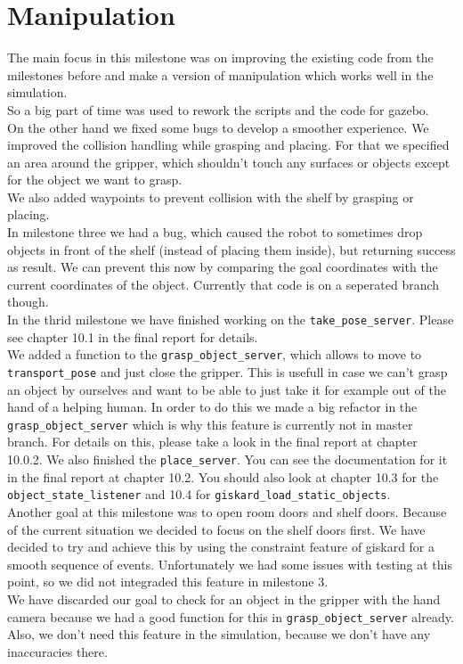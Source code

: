 \documentclass[main.tex]{subfiles}
\begin{document}
	
	\chapter{Manipulation}
	
	The main focus in this milestone was on improving the existing code from the milestones before and make a version of manipulation which works well in the simulation.\\
	So a big part of time was used to rework the scripts and the code for gazebo.\\
	On the other hand we fixed some bugs to develop a smoother experience. We improved the collision handling while grasping and placing. For that we specified an area around the gripper, which shouldn't touch any surfaces or objects except for the object we want to grasp.\\
	We also added waypoints to prevent collision with the shelf by grasping or placing.\\
	In milestone three we had a bug, which caused the robot to sometimes drop objects in front of the shelf (instead of placing them inside), but returning success as result. We can prevent this now by comparing the goal coordinates with the current coordinates of the object. Currently that code is on a seperated branch though.\\
	In the thrid milestone we have finished working on the \texttt{take\_pose\_server}. Please see chapter 10.1 in the final report for details.\\
	We added a function to the \texttt{grasp\_object\_server}, which allows to move to \texttt{transport\_pose} and just close the gripper. This is usefull in case we can't grasp an object by ourselves and want to be able to just take it for example out of the hand of a helping human. In order to do this we made a big refactor in the \texttt{grasp\_object\_server} which is why this feature is currently not in master branch. For details on this, please take a look in the final report at chapter 10.0.2.
	We also finished the \texttt{place\_server}. You can see the documentation for it in the final report at chapter 10.2. You should also look at chapter 10.3 for the \texttt{object\_state\_listener} and 10.4 for \texttt{giskard\_load\_static\_objects}.\\
	Another goal at this milestone was to open room doors and shelf doors. Because of the current situation we decided to focus on the shelf doors first. We have decided to try and achieve this by using the constraint feature of giskard for a smooth sequence of events. Unfortunately we had some issues with testing at this point, so we did not integraded this feature in milestone 3.\\
	We have discarded our goal to check for an object in the gripper with the hand camera because we had a good function for this in \texttt{grasp\_object\_server} already. Also, we don't need this feature in the simulation, because we don't have any inaccuracies there.
	
	
	
	


	
\end{document}
